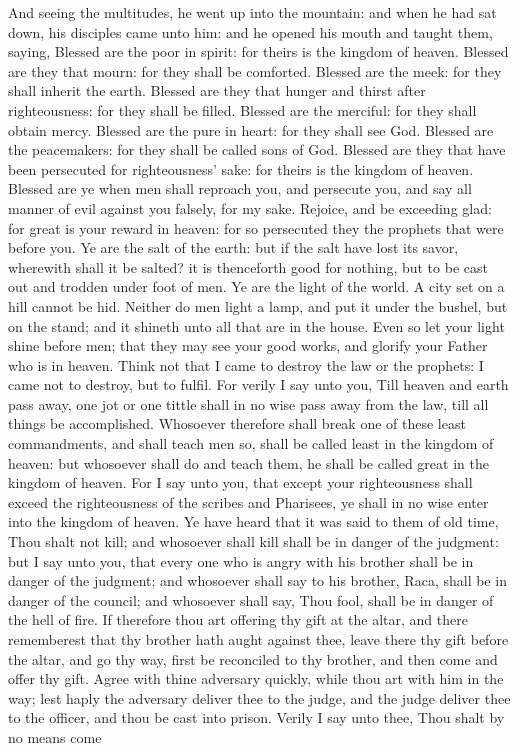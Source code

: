 And seeing the multitudes, he went up into the mountain: and when he had sat down, his disciples came unto him: and he opened his mouth and taught them, saying,  Blessed are the poor in spirit: for theirs is the kingdom of heaven.  Blessed are they that mourn: for they shall be comforted.  Blessed are the meek: for they shall inherit the earth.  Blessed are they that hunger and thirst after righteousness: for they shall be filled.  Blessed are the merciful: for they shall obtain mercy.  Blessed are the pure in heart: for they shall see God.  Blessed are the peacemakers: for they shall be called sons of God.  Blessed are they that have been persecuted for righteousness’ sake: for theirs is the kingdom of heaven. Blessed are ye when men shall reproach you, and persecute you, and say all manner of evil against you falsely, for my sake. Rejoice, and be exceeding glad: for great is your reward in heaven: for so persecuted they the prophets that were before you.  Ye are the salt of the earth: but if the salt have lost its savor, wherewith shall it be salted? it is thenceforth good for nothing, but to be cast out and trodden under foot of men. Ye are the light of the world. A city set on a hill cannot be hid. Neither do men light a lamp, and put it under the bushel, but on the stand; and it shineth unto all that are in the house. Even so let your light shine before men; that they may see your good works, and glorify your Father who is in heaven.  Think not that I came to destroy the law or the prophets: I came not to destroy, but to fulfil. For verily I say unto you, Till heaven and earth pass away, one jot or one tittle shall in no wise pass away from the law, till all things be accomplished. Whosoever therefore shall break one of these least commandments, and shall teach men so, shall be called least in the kingdom of heaven: but whosoever shall do and teach them, he shall be called great in the kingdom of heaven. For I say unto you, that except your righteousness shall exceed the righteousness of the scribes and Pharisees, ye shall in no wise enter into the kingdom of heaven.  Ye have heard that it was said to them of old time, Thou shalt not kill; and whosoever shall kill shall be in danger of the judgment: but I say unto you, that every one who is angry with his brother shall be in danger of the judgment; and whosoever shall say to his brother, Raca, shall be in danger of the council; and whosoever shall say, Thou fool, shall be in danger of the hell of fire. If therefore thou art offering thy gift at the altar, and there rememberest that thy brother hath aught against thee, leave there thy gift before the altar, and go thy way, first be reconciled to thy brother, and then come and offer thy gift. Agree with thine adversary quickly, while thou art with him in the way; lest haply the adversary deliver thee to the judge, and the judge deliver thee to the officer, and thou be cast into prison. Verily I say unto thee, Thou shalt by no means come 